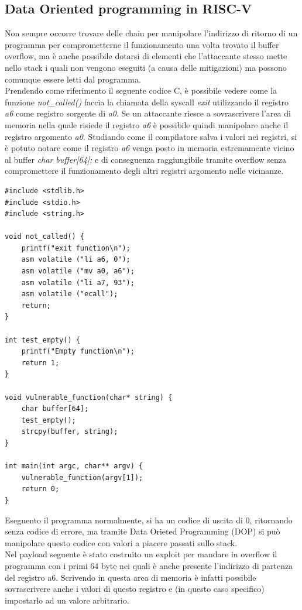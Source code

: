 \subsection*{Data Oriented programming in RISC-V}
Non sempre occorre trovare delle chain per manipolare l'indirizzo di ritorno di un programma per comprometterne il funzionamento una volta trovato il buffer overflow, ma è anche possibile dotarsi di elementi che l'attaccante stesso mette nello stack i quali non vengono eseguiti (a causa delle mitigazioni) ma possono comunque essere letti dal programma.\\
Prendendo come riferimento il seguente codice C, è possibile vedere come la funzione \textit{not\_called()} faccia la chiamata della syscall \textit{exit} utilizzando il registro \textit{a6} come registro sorgente di \textit{a0}. Se un attaccante riesce a sovrascrivere l'area di memoria nella quale risiede il registro \textit{a6} è possibile quindi manipolare anche il registro argomento \textit{a0}. Studiando come il compilatore salva i valori nei registri, si è potuto notare come il registro \textit{a6} venga posto in memoria estremamente vicino al buffer \textit{char buffer[64];} e di conseguenza raggiungibile tramite overflow senza compromettere il funzionamento degli altri registri argomento nelle vicinanze.
\begin{verbatim}
#include <stdlib.h>
#include <stdio.h>
#include <string.h>

void not_called() {
    printf("exit function\n");
    asm volatile ("li a6, 0");
    asm volatile ("mv a0, a6");
    asm volatile ("li a7, 93");
    asm volatile ("ecall");
    return;
}

int test_empty() {
    printf("Empty function\n");
    return 1;
}

void vulnerable_function(char* string) {
    char buffer[64];
    test_empty();
    strcpy(buffer, string);
}

int main(int argc, char** argv) {
    vulnerable_function(argv[1]);
    return 0;
}
\end{verbatim}
Eseguento il programma normalmente, si ha un codice di uscita di 0, ritornando senza codice di errore, ma tramite Data Orieted Programming (DOP) si può manipolare questo codice con valori a piacere passati sullo stack.\\
Nel payload seguente è stato costruito un exploit per mandare in overflow il programma con i primi 64 byte nei quali è anche presente l'indirizzo di partenza del registro a6. Scrivendo in questa area di memoria è infatti possibile sovrascrivere anche i valori di questo registro e (in questo caso specifico) impostarlo ad un valore arbitrario.
